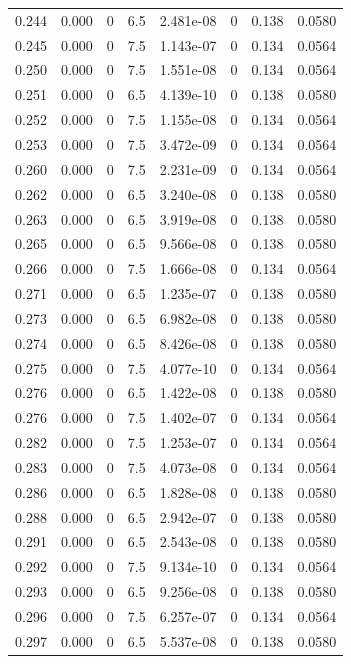 \documentclass[preview]{standalone}
\begin{document}
{{{\begin{tabular}{L{1.2cm}C{1.2cm} C{0.3cm}C{0.5cm} C{1.4cm}C{1.4cm} C{1.4cm}C{1.4cm}}
  0.244  &  0.000  & 0     & 6.5 &  2.481e-08  & 0  & 0.138 &  0.0580   \\ 
  0.245  &  0.000  & 0     & 7.5 &  1.143e-07  & 0  & 0.134 &  0.0564   \\ 
  0.250  &  0.000  & 0     & 7.5 &  1.551e-08  & 0  & 0.134 &  0.0564   \\ 
  0.251  &  0.000  & 0     & 6.5 &  4.139e-10  & 0  & 0.138 &  0.0580   \\ 
  0.252  &  0.000  & 0     & 7.5 &  1.155e-08  & 0  & 0.134 &  0.0564   \\ 
  0.253  &  0.000  & 0     & 7.5 &  3.472e-09  & 0  & 0.134 &  0.0564   \\ 
  0.260  &  0.000  & 0     & 7.5 &  2.231e-09  & 0  & 0.134 &  0.0564   \\ 
  0.262  &  0.000  & 0     & 6.5 &  3.240e-08  & 0  & 0.138 &  0.0580   \\ 
  0.263  &  0.000  & 0     & 6.5 &  3.919e-08  & 0  & 0.138 &  0.0580   \\ 
  0.265  &  0.000  & 0     & 6.5 &  9.566e-08  & 0  & 0.138 &  0.0580   \\ 
  0.266  &  0.000  & 0     & 7.5 &  1.666e-08  & 0  & 0.134 &  0.0564   \\ 
  0.271  &  0.000  & 0     & 6.5 &  1.235e-07  & 0  & 0.138 &  0.0580   \\ 
  0.273  &  0.000  & 0     & 6.5 &  6.982e-08  & 0  & 0.138 &  0.0580   \\ 
  0.274  &  0.000  & 0     & 6.5 &  8.426e-08  & 0  & 0.138 &  0.0580   \\ 
  0.275  &  0.000  & 0     & 7.5 &  4.077e-10  & 0  & 0.134 &  0.0564   \\ 
  0.276  &  0.000  & 0     & 6.5 &  1.422e-08  & 0  & 0.138 &  0.0580   \\ 
  0.276  &  0.000  & 0     & 7.5 &  1.402e-07  & 0  & 0.134 &  0.0564   \\ 
  0.282  &  0.000  & 0     & 7.5 &  1.253e-07  & 0  & 0.134 &  0.0564   \\ 
  0.283  &  0.000  & 0     & 7.5 &  4.073e-08  & 0  & 0.134 &  0.0564   \\ 
  0.286  &  0.000  & 0     & 6.5 &  1.828e-08  & 0  & 0.138 &  0.0580   \\ 
  0.288  &  0.000  & 0     & 6.5 &  2.942e-07  & 0  & 0.138 &  0.0580   \\ 
  0.291  &  0.000  & 0     & 6.5 &  2.543e-08  & 0  & 0.138 &  0.0580   \\ 
  0.292  &  0.000  & 0     & 7.5 &  9.134e-10  & 0  & 0.134 &  0.0564   \\ 
  0.293  &  0.000  & 0     & 6.5 &  9.256e-08  & 0  & 0.138 &  0.0580   \\ 
  0.296  &  0.000  & 0     & 7.5 &  6.257e-07  & 0  & 0.134 &  0.0564   \\ 
  0.297  &  0.000  & 0     & 6.5 &  5.537e-08  & 0  & 0.138 &  0.0580   \\ 
\hline 
\end{tabular} 

}}}
\end{document}
